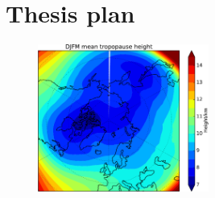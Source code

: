 

\section{Thesis plan}

\begin{figure}
 \centering
 \noindent\includegraphics[width=0.5\textwidth]{figures/chapter-intro/mean_tropopause_height.pdf}
 \caption[]{ }
 \label{fig:cmip5_mslp_diff}
\end{figure}



